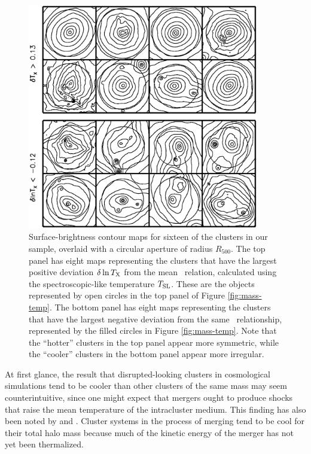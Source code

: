 \documentclass{aastex} \usepackage{natbib}
\begin{document}
\begin{figure}[b]
  \centering
  \includegraphics[width=0.9\textwidth,trim=0mm 20mm 0mm
  20mm,clip]{f2.eps}
  \caption{Surface-brightness contour maps for sixteen of the clusters
    in our sample, overlaid with a circular aperture of radius
    $R_{500}$.  The top panel has eight maps representing the clusters
    that have the largest positive deviation $\delta \ln T_{\rm X}$ from the
    mean \mtx\ relation, calculated using the spectroscopic-like
    temperature $T_{\rm SL}$.  These are the objects represented by open
    circles in the top panel of Figure \ref{fig:mass-temp}.  The
    bottom panel has eight maps representing the clusters that have
    the largest negative deviation from the same \mtx\ relationship,
    represented by the filled circles in Figure \ref{fig:mass-temp}.
    Note that the ``hotter'' clusters in the top panel appear more
    symmetric, while the ``cooler'' clusters in the bottom panel
    appear more irregular.}
  \label{fig:cluster_gallery_extremes}
\end{figure}

At first glance, the result that disrupted-looking clusters in
cosmological simulations tend to be cooler than other clusters of the
same mass may seem counterintuitive, since one might expect that
mergers ought to produce shocks that raise the mean temperature of the
intracluster medium.  This finding has also been noted by
\cite{2001ApJ...546..100M} and \cite{2006ApJ...650..128K}.  Cluster
systems in the process of merging tend to be cool for their total halo
mass because much of the kinetic energy of the merger has not yet been
thermalized.
\end{document}
